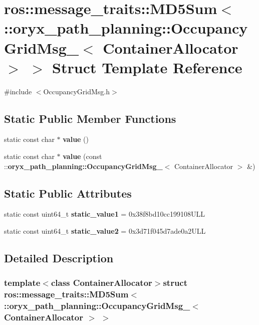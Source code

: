 \section{ros\-:\-:message\-\_\-traits\-:\-:\-M\-D5\-Sum$<$ \-:\-:oryx\-\_\-path\-\_\-planning\-:\-:\-Occupancy\-Grid\-Msg\-\_\-$<$ \-Container\-Allocator $>$ $>$ \-Struct \-Template \-Reference}
\label{structros_1_1message__traits_1_1MD5Sum_3_01_1_1oryx__path__planning_1_1OccupancyGridMsg___3_01ContainerAllocator_01_4_01_4}


{\ttfamily \#include $<$\-Occupancy\-Grid\-Msg.\-h$>$}

\subsection*{\-Static \-Public \-Member \-Functions}
\begin{DoxyCompactItemize}
\item 
static const char $\ast$ {\bf value} ()
\item 
static const char $\ast$ {\bf value} (const \-::{\bf oryx\-\_\-path\-\_\-planning\-::\-Occupancy\-Grid\-Msg\-\_\-}$<$ \-Container\-Allocator $>$ \&)
\end{DoxyCompactItemize}
\subsection*{\-Static \-Public \-Attributes}
\begin{DoxyCompactItemize}
\item 
static const uint64\-\_\-t {\bf static\-\_\-value1} = 0x38f8bd10cc199108\-U\-L\-L
\item 
static const uint64\-\_\-t {\bf static\-\_\-value2} = 0x3d71f045d7ade0a2\-U\-L\-L
\end{DoxyCompactItemize}


\subsection{\-Detailed \-Description}
\subsubsection*{template$<$class Container\-Allocator$>$struct ros\-::message\-\_\-traits\-::\-M\-D5\-Sum$<$ \-::oryx\-\_\-path\-\_\-planning\-::\-Occupancy\-Grid\-Msg\-\_\-$<$ Container\-Allocator $>$ $>$}



